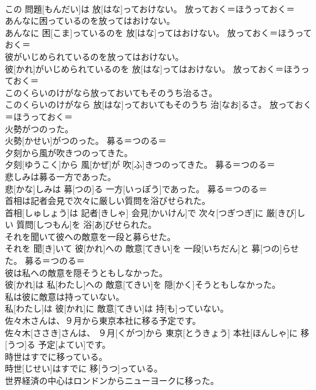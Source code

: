 \documentclass[8pt]{extreport}
\begin{document}
\begin{CJK}{UTF8}{min}
\\	この 問題[もんだい]は 放[はな]っておけない。	放っておく＝ほうっておく＝ 
\\	あんなに困っているのを放ってはおけない。	
\\	あんなに 困[こま]っているのを 放[はな]ってはおけない。	放っておく＝ほうっておく＝ 
\\	彼がいじめられているのを放ってはおけない。	
\\	彼[かれ]がいじめられているのを 放[はな]ってはおけない。	放っておく＝ほうっておく＝ 
\\	このくらいのけがなら放っておいてもそのうち治るさ。	
\\	このくらいのけがなら 放[はな]っておいてもそのうち 治[なお]るさ。	放っておく＝ほうっておく＝ 
\\	火勢がつのった。	
\\	火勢[かせい]がつのった。	募る＝つのる＝ 
\\	夕刻から風が吹きつのってきた。	
\\	夕刻[ゆうこく]から 風[かぜ]が 吹[ふ]きつのってきた。	募る＝つのる＝ 
\\	悲しみは募る一方であった。	
\\	悲[かな]しみは 募[つの]る 一方[いっぽう]であった。	募る＝つのる＝ 
\\	首相は記者会見で次々に厳しい質問を浴びせられた。	
\\	首相[しゅしょう]は 記者[きしゃ] 会見[かいけん]で 次々[つぎつぎ]に 厳[きび]しい 質問[しつもん]を 浴[あ]びせられた。	
\\	それを聞いて彼への敵意を一段と募らせた。	
\\	それを 聞[き]いて 彼[かれ]への 敵意[てきい]を 一段[いちだん]と 募[つの]らせた。	募る＝つのる＝ 
\\	彼は私への敵意を隠そうともしなかった。	
\\	彼[かれ]は 私[わたし]への 敵意[てきい]を 隠[かく]そうともしなかった。	
\\	私は彼に敵意は持っていない。	
\\	私[わたし]は 彼[かれ]に 敵意[てきい]は 持[も]っていない。	
\\	佐々木さんは、９月から東京本社に移る予定です。	
\\	佐々木[ささき]さんは、 ９月[くがつ]から 東京[とうきょう] 本社[ほんしゃ]に 移[うつ]る 予定[よてい]です。	
\\	時世はすでに移っている。	
\\	時世[じせい]はすでに 移[うつ]っている。	
\\	世界経済の中心はロンドンからニューヨークに移った。	

\end{CJK}
\end{document}
